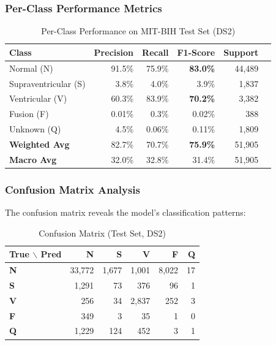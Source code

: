 \documentclass[12pt,a4paper]{article}
\begin{document}
\subsubsection{Per-Class Performance Metrics}

\begin{table}[H]
\centering
\begin{tabular}{@{}lrrrrr@{}}
\toprule
\textbf{Class} & \textbf{Precision} & \textbf{Recall} & \textbf{F1-Score} & \textbf{Support} \\ 
\midrule
Normal (N) & 91.5\% & 75.9\% & \textbf{83.0\%} & 44,489 \\
Supraventricular (S) & 3.8\% & 4.0\% & 3.9\% & 1,837 \\
Ventricular (V) & 60.3\% & 83.9\% & \textbf{70.2\%} & 3,382 \\
Fusion (F) & 0.01\% & 0.3\% & 0.02\% & 388 \\
Unknown (Q) & 4.5\% & 0.06\% & 0.11\% & 1,809 \\
\midrule
\textbf{Weighted Avg} & 82.7\% & 70.7\% & \textbf{75.9\%} & 51,905 \\
\textbf{Macro Avg} & 32.0\% & 32.8\% & 31.4\% & 51,905 \\
\bottomrule
\end{tabular}
\caption{Per-Class Performance on MIT-BIH Test Set (DS2)}
\label{tab:class_performance}
\end{table}

\subsubsection{Confusion Matrix Analysis}

The confusion matrix reveals the model's classification patterns:

\begin{table}[H]
\centering
\begin{tabular}{@{}l|rrrrr@{}}
\toprule
\textbf{True $\backslash$ Pred} & \textbf{N} & \textbf{S} & \textbf{V} & \textbf{F} & \textbf{Q} \\ 
\midrule
\textbf{N} & 33,772 & 1,677 & 1,001 & 8,022 & 17 \\
\textbf{S} & 1,291 & 73 & 376 & 96 & 1 \\
\textbf{V} & 256 & 34 & 2,837 & 252 & 3 \\
\textbf{F} & 349 & 3 & 35 & 1 & 0 \\
\textbf{Q} & 1,229 & 124 & 452 & 3 & 1 \\
\bottomrule
\end{tabular}
\caption{Confusion Matrix (Test Set, DS2)}
\label{tab:confusion_matrix}
\end{table}
\end{document}
